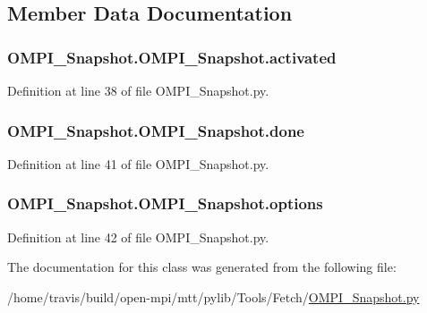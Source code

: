 \subsection{Member Data Documentation}
\hypertarget{class_o_m_p_i___snapshot_1_1_o_m_p_i___snapshot_a0e9ff636eea9c2e0593cc1e4f57c3b24}{
\subsubsection[{activated}]{\setlength{\rightskip}{0pt plus 5cm}O\-M\-P\-I\-\_\-\-Snapshot.\-O\-M\-P\-I\-\_\-\-Snapshot.\-activated}}\label{class_o_m_p_i___snapshot_1_1_o_m_p_i___snapshot_a0e9ff636eea9c2e0593cc1e4f57c3b24}


Definition at line 38 of file O\-M\-P\-I\-\_\-\-Snapshot.\-py.

\hypertarget{class_o_m_p_i___snapshot_1_1_o_m_p_i___snapshot_a6434d87ad221c54daecf11d8ad5604f8}{
\subsubsection[{done}]{\setlength{\rightskip}{0pt plus 5cm}O\-M\-P\-I\-\_\-\-Snapshot.\-O\-M\-P\-I\-\_\-\-Snapshot.\-done}}\label{class_o_m_p_i___snapshot_1_1_o_m_p_i___snapshot_a6434d87ad221c54daecf11d8ad5604f8}


Definition at line 41 of file O\-M\-P\-I\-\_\-\-Snapshot.\-py.

\hypertarget{class_o_m_p_i___snapshot_1_1_o_m_p_i___snapshot_a1977ca5a7120bd199d1de101a0fb8c34}{
\subsubsection[{options}]{\setlength{\rightskip}{0pt plus 5cm}O\-M\-P\-I\-\_\-\-Snapshot.\-O\-M\-P\-I\-\_\-\-Snapshot.\-options}}\label{class_o_m_p_i___snapshot_1_1_o_m_p_i___snapshot_a1977ca5a7120bd199d1de101a0fb8c34}


Definition at line 42 of file O\-M\-P\-I\-\_\-\-Snapshot.\-py.



The documentation for this class was generated from the following file\-:\begin{DoxyCompactItemize}
\item 
/home/travis/build/open-\/mpi/mtt/pylib/\-Tools/\-Fetch/\hyperlink{_o_m_p_i___snapshot_8py}{O\-M\-P\-I\-\_\-\-Snapshot.\-py}\end{DoxyCompactItemize}

